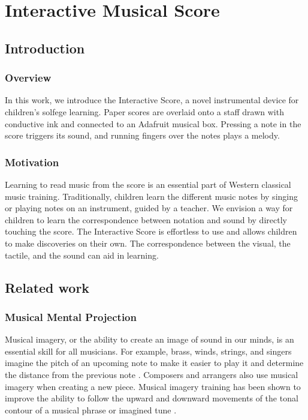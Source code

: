 \chapter{Interactive Musical Score}

\section{Introduction}

\subsection*{Overview}

In this work, we introduce the Interactive Score, a novel instrumental device for children's solfege
learning. Paper scores are overlaid onto a staff drawn with conductive ink and
connected to an Adafruit musical box. Pressing a note in the score triggers its sound,
and running fingers over the notes plays a melody.


\subsection*{Motivation}

Learning to read music from the score is an essential part of Western classical music
training. Traditionally, children learn the different music notes by singing or playing
notes on an instrument, guided by a teacher. We envision a way for children to learn
the correspondence between notation and sound by directly touching the score.
The Interactive Score is effortless to use and allows children to make discoveries on
their own. The correspondence between the visual, the tactile, and the sound can aid
in learning.

\section{Related work}

\subsection{Musical Mental Projection}

Musical imagery, or the ability to create an image of sound in our minds, is an essential
skill for all musicians. For example, brass, winds, strings, and singers imagine the
pitch of an upcoming note to make it easier to play it and determine the distance from
the previous note
\cite{zatorre2005mental}. Composers and arrangers also use musical imagery when creating
a new piece. Musical imagery training has been shown to improve the ability to follow
the upward and downward movements of the tonal contour of a musical phrase or
imagined tune
\cite{weber1986musical}.

